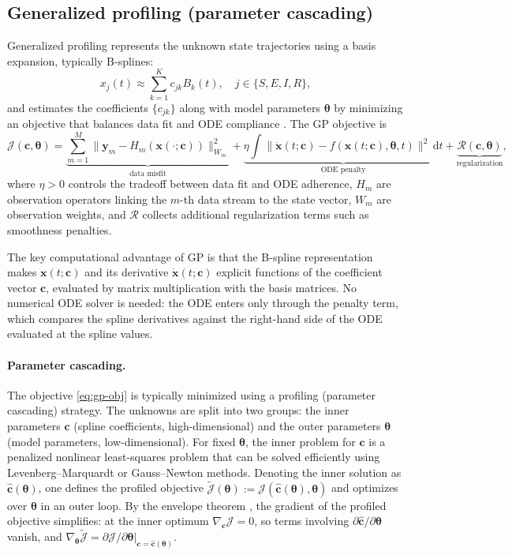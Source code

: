 \documentclass[11pt]{article}
\newcommand{\bx}{\bm{x}}
\newcommand{\bc}{\bm{c}}
\newcommand{\btheta}{\bm{\theta}}
\newcommand{\dd}{\,\mathrm{d}}
\begin{document}
\subsection{Generalized profiling (parameter cascading)}\label{sec:bg:gp}

Generalized profiling represents the unknown state trajectories using a basis expansion, typically B-splines:
\begin{equation}\label{eq:basis-expansion}
  x_j(t) \approx \sum_{k=1}^{K} c_{jk} B_k(t), \quad j \in \{S, E, I, R\},
\end{equation}
and estimates the coefficients $\{c_{jk}\}$ along with model parameters $\btheta$ by minimizing an objective that balances data fit and ODE compliance \citep{Ramsay2007}. The GP objective is
\begin{equation}\label{eq:gp-obj}
  \mathcal{J}(\bc,\btheta)
  = \underbrace{\sum_{m=1}^{M}\bigl\|\bm{y}_m - H_m(\bx(\cdot;\bc))\bigr\|^2_{W_m}}_{\text{data misfit}}
  + \underbrace{\eta\int\bigl\|\dot{\bx}(t;\bc)-f(\bx(t;\bc),\btheta,t)\bigr\|^2\dd t}_{\text{ODE penalty}}
  + \underbrace{\mathcal{R}(\bc,\btheta)}_{\text{regularization}},
\end{equation}
where $\eta>0$ controls the tradeoff between data fit and ODE adherence, $H_m$ are observation operators linking the $m$-th data stream to the state vector, $W_m$ are observation weights, and $\mathcal{R}$ collects additional regularization terms such as smoothness penalties.

The key computational advantage of GP is that the B-spline representation makes $\bx(t;\bc)$ and its derivative $\dot{\bx}(t;\bc)$ explicit functions of the coefficient vector $\bc$, evaluated by matrix multiplication with the basis matrices. No numerical ODE solver is needed: the ODE enters only through the penalty term, which compares the spline derivatives against the right-hand side of the ODE evaluated at the spline values.

\paragraph{Parameter cascading.}
The objective \eqref{eq:gp-obj} is typically minimized using a profiling (parameter cascading) strategy. The unknowns are split into two groups: the inner parameters $\bc$ (spline coefficients, high-dimensional) and the outer parameters $\btheta$ (model parameters, low-dimensional). For fixed $\btheta$, the inner problem for $\bc$ is a penalized nonlinear least-squares problem that can be solved efficiently using Levenberg--Marquardt or Gauss--Newton methods. Denoting the inner solution as $\hat{\bc}(\btheta)$, one defines the profiled objective $\widetilde{\mathcal{J}}(\btheta) := \mathcal{J}(\hat{\bc}(\btheta), \btheta)$ and optimizes over $\btheta$ in an outer loop. By the envelope theorem \citep{Ramsay2007}, the gradient of the profiled objective simplifies: at the inner optimum $\nabla_{\bc}\mathcal{J}=0$, so terms involving $\partial\hat{\bc}/\partial\btheta$ vanish, and $\nabla_{\btheta}\widetilde{\mathcal{J}} = \partial\mathcal{J}/\partial\btheta \big|_{\bc=\hat{\bc}(\btheta)}$.
\end{document}

